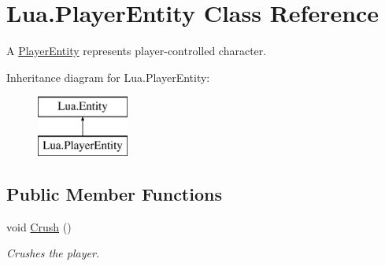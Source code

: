 \hypertarget{class_lua_1_1_player_entity}{}\section{Lua.\+Player\+Entity Class Reference}
\label{class_lua_1_1_player_entity}


A \mbox{\hyperlink{class_lua_1_1_player_entity}{Player\+Entity}} represents player-\/controlled character.  


Inheritance diagram for Lua.\+Player\+Entity\+:\begin{figure}[H]
\begin{center}
\leavevmode
\includegraphics[height=2.000000cm]{class_lua_1_1_player_entity}
\end{center}
\end{figure}
\subsection*{Public Member Functions}
\begin{DoxyCompactItemize}
\item 
void \mbox{\hyperlink{class_lua_1_1_player_entity_a9d1469da41be5408b4d6702dc04f3351}{Crush}} ()
\begin{DoxyCompactList}\small\item\em Crushes the player. \end{DoxyCompactList}\end{DoxyCompactItemize}
